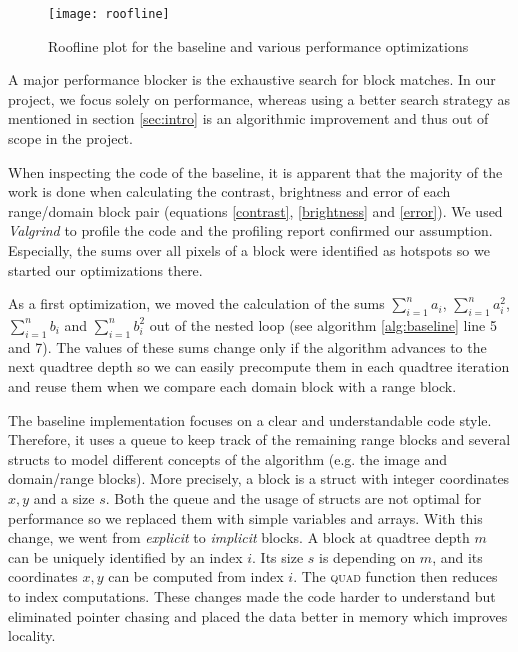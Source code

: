\begin{figure}
  \texttt{[image: roofline]}
  \caption{Roofline plot for the baseline and various performance optimizations}
  \label{fig:roofline}
\end{figure}

 A major performance blocker is the exhaustive search for block matches.
In our project, we focus solely on performance,
whereas using a better search strategy as mentioned in section \ref{sec:intro} is an algorithmic improvement
and thus out of scope in the project.

When inspecting the code of the baseline, it is apparent that the majority of the work
is done when calculating the contrast, brightness and error of each range/domain block pair
(equations \ref{contrast}, \ref{brightness} and \ref{error}). We used \textit{Valgrind}
\cite{valgrind} to profile the code and the profiling report confirmed our assumption. Especially, the sums
over all pixels of a block were identified as hotspots so we started our optimizations there.

 As a first optimization, we moved the calculation of the sums $\sum_{i=1}^n a_i$,
$\sum_{i=1}^n a_i^2$, $\sum_{i=1}^n b_i$ and $\sum_{i=1}^n b_i^2$ out of the nested loop
(see algorithm \ref{alg:baseline} line 5 and 7). The values of these sums change only if the algorithm advances
to the next quadtree depth so we can easily precompute them in each quadtree iteration and reuse them when we
compare each domain block with a range block.

The baseline implementation focuses on a clear and understandable code style. Therefore, it uses a queue
to keep track of the remaining range blocks and several structs to model different concepts of the algorithm
(e.g. the image and domain/range blocks). More precisely, a block is a struct with integer coordinates $x,y$ and a size $s$.
Both the queue and the usage of structs are not optimal for performance so we replaced them
with simple variables and arrays. With this change, we went from \textit{explicit} to \textit{implicit} blocks.
A block at quadtree depth $m$ can be uniquely identified by an index $i$. Its size $s$ is depending on $m$,
and its coordinates $x,y$ can be computed from index $i$. The \textsc{quad} function then reduces to index computations.
These changes made the code harder to understand but eliminated pointer chasing and placed the
data better in memory which improves locality.

